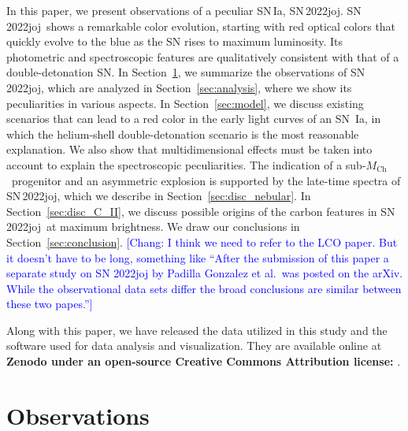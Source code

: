 \documentclass[twocolumn]{aastex631}
\newcommand{\sn}{SN\,2022joj}
\newcommand{\Mch}{$M_\mathrm{Ch}$}
\newcommand{\chang}[1]{\textcolor{blue}{[Chang: #1]}}
\newcommand{\rev}[1]{\textbf{#1}}
\begin{document}
\begin{CJK*}{UTF8}{gbsn}
In this paper, we present observations of a peculiar SN\,Ia, \sn. \sn\ shows a remarkable color evolution, starting with red optical colors that quickly evolve to the blue as the SN rises to maximum luminosity. Its photometric and spectroscopic features are qualitatively consistent with that of a double-detonation SN. In Section~\ref{sec:obs}, we summarize the observations of \sn, which are analyzed in Section~\ref{sec:analysis}, where we show its peculiarities in various aspects. In Section~\ref{sec:model}, we discuss existing scenarios that can lead to a red color in the early light curves of an SN \,Ia, in which the helium-shell double-detonation scenario is the most reasonable explanation. We also show that multidimensional effects must be taken into account to explain the spectroscopic peculiarities. 
The indication of a sub-\Mch\ progenitor and an asymmetric explosion is supported by the late-time spectra of \sn, which we describe in Section~\ref{sec:disc_nebular}. In Section~\ref{sec:disc_C_II}, we discuss possible origins of the carbon features in \sn\ at maximum brightness.
We draw our conclusions in Section~\ref{sec:conclusion}. \chang{I think we need to refer to the LCO paper. But it doesn't have to be long, something like ``After the submission of this paper a separate study on SN 2022joj by Padilla Gonzalez et al.\ was posted on the arXiv. While the observational data sets differ the broad conclusions are similar between these two papes.''}

Along with this paper, we have released the data utilized in this study and the software used for data analysis and visualization. They are available online at \rev{Zenodo under an open-source 
Creative Commons Attribution license: \dataset[10.5281/zenodo.8331024]{\doi{10.5281/zenodo.8331024}}}.

\section{Observations} \label{sec:obs}

\end{CJK*}
\end{document}
